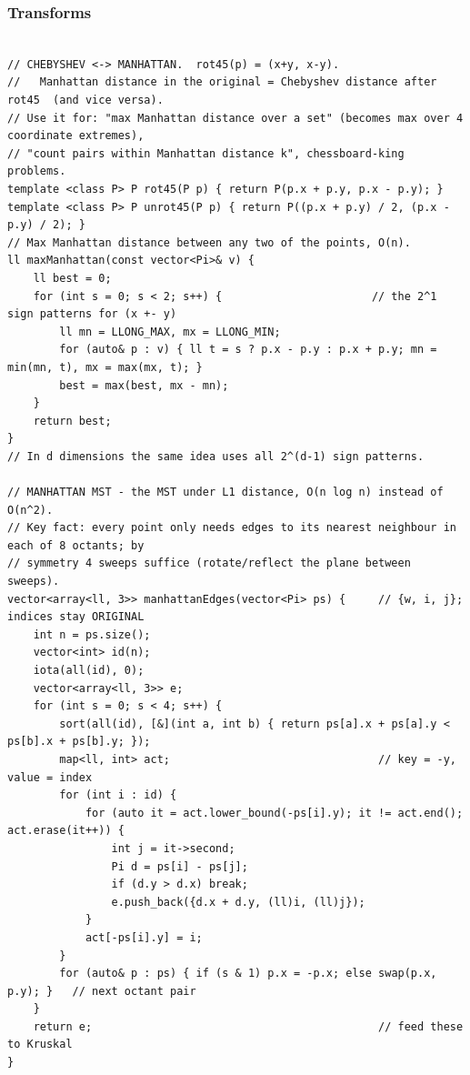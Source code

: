 \documentclass[9pt,a4paper,twocolumn]{extarticle}
\begin{document}
\subsubsection{Transforms}
\nopagebreak
\begin{lstlisting}

// CHEBYSHEV <-> MANHATTAN.  rot45(p) = (x+y, x-y).
//   Manhattan distance in the original = Chebyshev distance after rot45  (and vice versa).
// Use it for: "max Manhattan distance over a set" (becomes max over 4 coordinate extremes),
// "count pairs within Manhattan distance k", chessboard-king problems.
template <class P> P rot45(P p) { return P(p.x + p.y, p.x - p.y); }
template <class P> P unrot45(P p) { return P((p.x + p.y) / 2, (p.x - p.y) / 2); }
// Max Manhattan distance between any two of the points, O(n).
ll maxManhattan(const vector<Pi>& v) {
    ll best = 0;
    for (int s = 0; s < 2; s++) {                       // the 2^1 sign patterns for (x +- y)
        ll mn = LLONG_MAX, mx = LLONG_MIN;
        for (auto& p : v) { ll t = s ? p.x - p.y : p.x + p.y; mn = min(mn, t), mx = max(mx, t); }
        best = max(best, mx - mn);
    }
    return best;
}
// In d dimensions the same idea uses all 2^(d-1) sign patterns.

// MANHATTAN MST - the MST under L1 distance, O(n log n) instead of O(n^2).
// Key fact: every point only needs edges to its nearest neighbour in each of 8 octants; by
// symmetry 4 sweeps suffice (rotate/reflect the plane between sweeps).
vector<array<ll, 3>> manhattanEdges(vector<Pi> ps) {     // {w, i, j}; indices stay ORIGINAL
    int n = ps.size();
    vector<int> id(n);
    iota(all(id), 0);
    vector<array<ll, 3>> e;
    for (int s = 0; s < 4; s++) {
        sort(all(id), [&](int a, int b) { return ps[a].x + ps[a].y < ps[b].x + ps[b].y; });
        map<ll, int> act;                                // key = -y, value = index
        for (int i : id) {
            for (auto it = act.lower_bound(-ps[i].y); it != act.end(); act.erase(it++)) {
                int j = it->second;
                Pi d = ps[i] - ps[j];
                if (d.y > d.x) break;
                e.push_back({d.x + d.y, (ll)i, (ll)j});
            }
            act[-ps[i].y] = i;
        }
        for (auto& p : ps) { if (s & 1) p.x = -p.x; else swap(p.x, p.y); }   // next octant pair
    }
    return e;                                            // feed these to Kruskal
}


\end{lstlisting}
\end{document}
